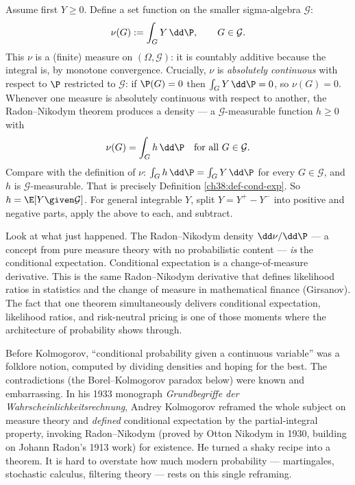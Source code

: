 \begin{whybox}
Assume first $Y \ge 0$. Define a set function on the smaller sigma-algebra $\mathcal{G}$:
\[
  \nu(G) := \int_G Y \,\dd\P, \qquad G \in \mathcal{G}.
\]
This $\nu$ is a (finite) measure on $(\Omega, \mathcal{G})$: it is countably additive because the
integral is, by monotone convergence. Crucially, $\nu$ is \emph{absolutely continuous} with respect
to $\P$ restricted to $\mathcal{G}$: if $\P(G) = 0$ then $\int_G Y\,\dd\P = 0$, so $\nu(G) = 0$.
Whenever one measure is absolutely continuous with respect to another, the Radon--Nikodym theorem
produces a density --- a $\mathcal{G}$-measurable function $h \ge 0$ with
\[
  \nu(G) = \int_G h \,\dd\P \quad\text{for all } G \in \mathcal{G}.
\]
Compare with the definition of $\nu$: $\int_G h\,\dd\P = \int_G Y\,\dd\P$ for every $G \in
\mathcal{G}$, and $h$ is $\mathcal{G}$-measurable. That is precisely Definition
\ref{ch38:def-cond-exp}. So $h = \E[Y\given\mathcal{G}]$. For general integrable $Y$, split $Y = Y^+
- Y^-$ into positive and negative parts, apply the above to each, and subtract.
\end{whybox}

\begin{aestheticbox}
Look at what just happened. The Radon--Nikodym density $\dd\nu/\dd\P$ --- a concept from pure measure
theory with no probabilistic content --- \emph{is} the conditional expectation. Conditional
expectation is a change-of-measure derivative. This is the same Radon--Nikodym derivative that
defines likelihood ratios in statistics and the change of measure in mathematical finance (Girsanov).
The fact that one theorem simultaneously delivers conditional expectation, likelihood ratios, and
risk-neutral pricing is one of those moments where the architecture of probability shows through.
\end{aestheticbox}

\begin{historybox}
Before Kolmogorov, ``conditional probability given a continuous variable'' was a folklore notion,
computed by dividing densities and hoping for the best. The contradictions (the Borel--Kolmogorov
paradox below) were known and embarrassing. In his 1933 monograph \emph{Grundbegriffe der
Wahrscheinlichkeitsrechnung}, Andrey Kolmogorov reframed the whole subject on measure theory and
\emph{defined} conditional expectation by the partial-integral property, invoking Radon--Nikodym
(proved by Otton Nikodym in 1930, building on Johann Radon's 1913 work) for existence. He turned a
shaky recipe into a theorem. It is hard to overstate how much modern probability --- martingales,
stochastic calculus, filtering theory --- rests on this single reframing.
\end{historybox}

